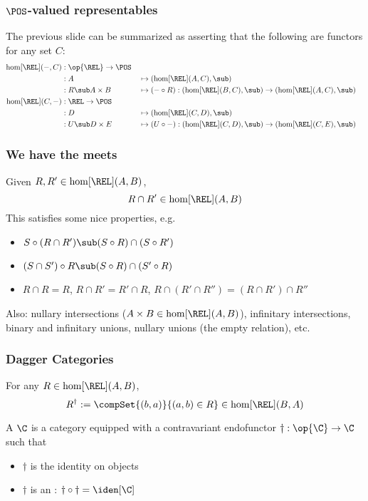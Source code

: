 {    \begin{frame}
        \frametitle{$\POS$-valued representables}
        The previous slide can be summarized as asserting that the following are functors for any set $C$:\pause
        {\large \begin{alignat*}{2}
            \hom[\REL](-,C) &: \op{\REL} \to \POS\\
                            &: A           &&\mapsto (\hom[\REL](A,C),\sub)\\
                            &: R\sub A\times B &&\mapsto (-\circ R):(\hom[\REL](B,C),\sub)\to (\hom[\REL](A,C),\sub)\\
            \hom[\REL](C,-) &: \REL \to \POS\\
                            &: D           &&\mapsto (\hom[\REL](C,D),\sub)\\
                            &: U\sub D\times E &&\mapsto (U\circ -):(\hom[\REL](C,D),\sub)\to (\hom[\REL](C,E),\sub)\\
        \end{alignat*}}
    \end{frame}

    \begin{frame}
        \frametitle{We have the meets}\pause
        Given $R,R'\in\hom[\REL](A,B)$,
            \[ R\cap R'\in \hom[\REL](A,B) \]\pause
        This satisfies some nice properties, e.g.
        {\large
            \begin{itemize}
                \item $S\circ (R\cap R') \sub (S\circ R)\cap (S\circ R')$
                \item $(S\cap S')\circ R \sub (S\circ R)\cap (S'\circ R)$\pause
                \item $R\cap R = R$, \quad $R\cap R'=R'\cap R$, \quad $R\cap(R'\cap R'')=(R\cap R')\cap R''$
            \end{itemize}
        }\pause

        Also: nullary intersections ($A\times B\in\hom[\REL](A,B)$), infinitary intersections, binary and infinitary unions, nullary unions (the empty relation), etc. 
    \end{frame}

    \begin{frame}
        \frametitle{Dagger Categories}
        \pause
        For any $R\in\hom[\REL](A,B)$,
            \[ R^{\dagger} := \compSet{(b,a)}{(a,b)\in R} \in \hom[\REL](B,A) \]\pause

         A  $\C$ is a category equipped with a contravariant endofunctor ${\dagger}:\op{\C}\to\C$ 
        \pause such that
        \begin{itemize}
            \item $\dagger$ is the identity on objects\pause
            \item $\dagger$ is an : $\dagger\circ\dagger = \iden[\C]$
        \end{itemize}
    \end{frame}

}
